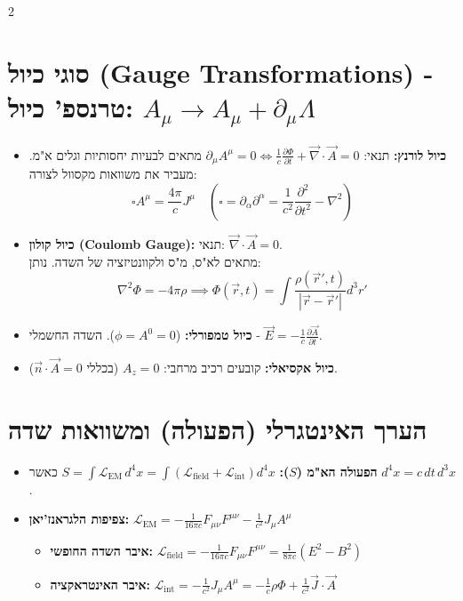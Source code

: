 \documentclass[10pt,a4paper]{article}
\begin{document}
\begin{multicols*}{2}
\section*{סוגי כיול (\textenglish{Gauge Transformations}) - טרנספ' כיול: $A_\mu \to A_\mu + \partial_\mu \Lambda$}
\begin{itemize}
    \item \textbf{כיול לורנץ:} תנאי: 
    $
    \partial_\mu A^\mu = 0 \iff \frac{1}{c}\frac{\partial \Phi}{\partial t} + \vec{\nabla}\cdot\vec{A} = 0
    $
    מתאים לבעיות יחסותיות וגלים א"מ. מעביר את משוואות מקסוול לצורה:
    \[
    \square A^\mu = \frac{4\pi}{c}J^\mu \quad \left(\square = \partial_\alpha \partial^\alpha = \frac{1}{c^2}\frac{\partial^2}{\partial t^2} - \nabla^2\right)
    \]
    \item \textbf{כיול קולון (\textenglish{Coulomb Gauge}):} תנאי: $\vec{\nabla}\cdot\vec{A} = 0$.\\
    מתאים לא"ס, מ"ס ולקוונטיזציה של השדה. נותן:
    \[
    \nabla^2 \Phi = -4\pi\rho \implies \Phi(\vec{r}, t) = \int \frac{\rho(\vec{r}', t)}{|\vec{r}-\vec{r}'|} d^3 r'
    \]
    \item \textbf{כיול טמפורלי:} ($ \phi =A^0 = 0$). השדה החשמלי - $\vec{E} = -\frac{1}{c}\frac{\partial \vec{A}}{\partial t}$.

\item \textbf{כיול אקסיאלי:} קובעים רכיב מרחבי: $A_z = 0$ (בכללי $\vec{n} \cdot \vec{A} = 0$).
\end{itemize}

\section{הערך האינטגרלי (הפעולה) ומשוואות שדה}

\begin{itemize}
    \item \textbf{הפעולה הא"מ ($S$):}
    $
    S = \int \mathcal{L}_{\text{EM}} \, d^4x = \int \left( \mathcal{L}_{\text{field}} + \mathcal{L}_{\text{int}} \right) d^4x
    $
    כאשר $d^4x = c \, dt \, d^3x$.

    \item \textbf{צפיפות הלגראנז'יאן:}
    $
    \mathcal{L}_{\text{EM}} = -\frac{1}{16\pi c} F_{\mu\nu}F^{\mu\nu} - \frac{1}{c^2} J_\mu A^\mu
    $
    \begin{itemize}
    \item \textbf{איבר השדה החופשי:} $\mathcal{L}_{\text{field}} = -\frac{1}{16\pi c} F_{\mu\nu}F^{\mu\nu} = \frac{1}{8\pi c} \left( E^2 - B^2 \right)$
        \item \textbf{איבר האינטראקציה:} $\mathcal{L}_{\text{int}} = -\frac{1}{c^2} J_\mu A^\mu = -\frac{1}{c} \rho \Phi + \frac{1}{c^2} \vec{J} \cdot \vec{A}$
    \end{itemize}


\end{itemize}
\end{multicols*}
\end{document}
